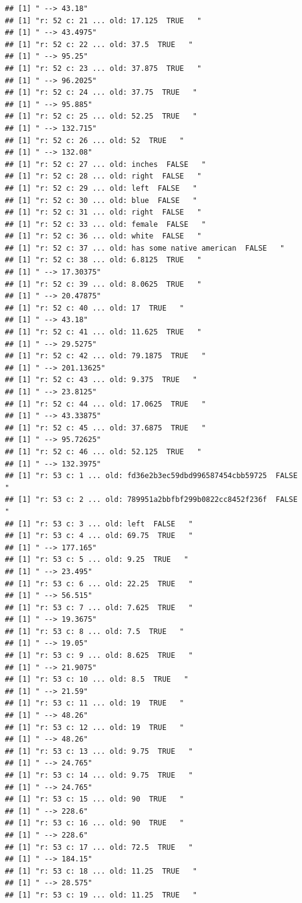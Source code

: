 \documentclass[]{article}
\begin{document}
\begin{verbatim}
## [1] " --> 43.18"
## [1] "r: 52 c: 21 ... old: 17.125  TRUE   "
## [1] " --> 43.4975"
## [1] "r: 52 c: 22 ... old: 37.5  TRUE   "
## [1] " --> 95.25"
## [1] "r: 52 c: 23 ... old: 37.875  TRUE   "
## [1] " --> 96.2025"
## [1] "r: 52 c: 24 ... old: 37.75  TRUE   "
## [1] " --> 95.885"
## [1] "r: 52 c: 25 ... old: 52.25  TRUE   "
## [1] " --> 132.715"
## [1] "r: 52 c: 26 ... old: 52  TRUE   "
## [1] " --> 132.08"
## [1] "r: 52 c: 27 ... old: inches  FALSE   "
## [1] "r: 52 c: 28 ... old: right  FALSE   "
## [1] "r: 52 c: 29 ... old: left  FALSE   "
## [1] "r: 52 c: 30 ... old: blue  FALSE   "
## [1] "r: 52 c: 31 ... old: right  FALSE   "
## [1] "r: 52 c: 33 ... old: female  FALSE   "
## [1] "r: 52 c: 36 ... old: white  FALSE   "
## [1] "r: 52 c: 37 ... old: has some native american  FALSE   "
## [1] "r: 52 c: 38 ... old: 6.8125  TRUE   "
## [1] " --> 17.30375"
## [1] "r: 52 c: 39 ... old: 8.0625  TRUE   "
## [1] " --> 20.47875"
## [1] "r: 52 c: 40 ... old: 17  TRUE   "
## [1] " --> 43.18"
## [1] "r: 52 c: 41 ... old: 11.625  TRUE   "
## [1] " --> 29.5275"
## [1] "r: 52 c: 42 ... old: 79.1875  TRUE   "
## [1] " --> 201.13625"
## [1] "r: 52 c: 43 ... old: 9.375  TRUE   "
## [1] " --> 23.8125"
## [1] "r: 52 c: 44 ... old: 17.0625  TRUE   "
## [1] " --> 43.33875"
## [1] "r: 52 c: 45 ... old: 37.6875  TRUE   "
## [1] " --> 95.72625"
## [1] "r: 52 c: 46 ... old: 52.125  TRUE   "
## [1] " --> 132.3975"
## [1] "r: 53 c: 1 ... old: fd36e2b3ec59dbd996587454cbb59725  FALSE   "
## [1] "r: 53 c: 2 ... old: 789951a2bbfbf299b0822cc8452f236f  FALSE   "
## [1] "r: 53 c: 3 ... old: left  FALSE   "
## [1] "r: 53 c: 4 ... old: 69.75  TRUE   "
## [1] " --> 177.165"
## [1] "r: 53 c: 5 ... old: 9.25  TRUE   "
## [1] " --> 23.495"
## [1] "r: 53 c: 6 ... old: 22.25  TRUE   "
## [1] " --> 56.515"
## [1] "r: 53 c: 7 ... old: 7.625  TRUE   "
## [1] " --> 19.3675"
## [1] "r: 53 c: 8 ... old: 7.5  TRUE   "
## [1] " --> 19.05"
## [1] "r: 53 c: 9 ... old: 8.625  TRUE   "
## [1] " --> 21.9075"
## [1] "r: 53 c: 10 ... old: 8.5  TRUE   "
## [1] " --> 21.59"
## [1] "r: 53 c: 11 ... old: 19  TRUE   "
## [1] " --> 48.26"
## [1] "r: 53 c: 12 ... old: 19  TRUE   "
## [1] " --> 48.26"
## [1] "r: 53 c: 13 ... old: 9.75  TRUE   "
## [1] " --> 24.765"
## [1] "r: 53 c: 14 ... old: 9.75  TRUE   "
## [1] " --> 24.765"
## [1] "r: 53 c: 15 ... old: 90  TRUE   "
## [1] " --> 228.6"
## [1] "r: 53 c: 16 ... old: 90  TRUE   "
## [1] " --> 228.6"
## [1] "r: 53 c: 17 ... old: 72.5  TRUE   "
## [1] " --> 184.15"
## [1] "r: 53 c: 18 ... old: 11.25  TRUE   "
## [1] " --> 28.575"
## [1] "r: 53 c: 19 ... old: 11.25  TRUE   "

\end{verbatim}
\end{document}
